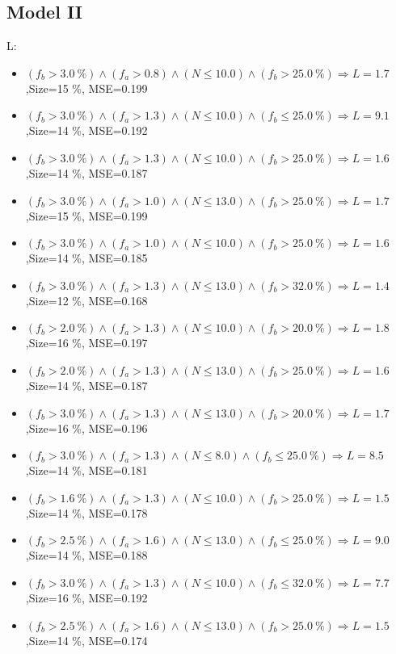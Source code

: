 \documentclass[numbered]{CSL}
\begin{document}
\subsection{Model II}
L:
\begin{itemize}
\item $(f_b > 3.0~\%) \land (f_a > 0.8) \land (N \leq 10.0) \land (f_b > 25.0~\%) \Rightarrow L = 1.7$,\hfill Size=15 \%, MSE=0.199
\item $(f_b > 3.0~\%) \land (f_a > 1.3) \land (N \leq 10.0) \land (f_b \leq 25.0~\%) \Rightarrow L = 9.1$,\hfill Size=14 \%, MSE=0.192
\item $(f_b > 3.0~\%) \land (f_a > 1.3) \land (N \leq 10.0) \land (f_b > 25.0~\%) \Rightarrow L = 1.6$,\hfill Size=14 \%, MSE=0.187
\item $(f_b > 3.0~\%) \land (f_a > 1.0) \land (N \leq 13.0) \land (f_b > 25.0~\%) \Rightarrow L = 1.7$,\hfill Size=15 \%, MSE=0.199
\item $(f_b > 3.0~\%) \land (f_a > 1.0) \land (N \leq 10.0) \land (f_b > 25.0~\%) \Rightarrow L = 1.6$,\hfill Size=14 \%, MSE=0.185
\item $(f_b > 3.0~\%) \land (f_a > 1.3) \land (N \leq 13.0) \land (f_b > 32.0~\%) \Rightarrow L = 1.4$,\hfill Size=12 \%, MSE=0.168
\item $(f_b > 2.0~\%) \land (f_a > 1.3) \land (N \leq 10.0) \land (f_b > 20.0~\%) \Rightarrow L = 1.8$,\hfill Size=16 \%, MSE=0.197
\item $(f_b > 2.0~\%) \land (f_a > 1.3) \land (N \leq 13.0) \land (f_b > 25.0~\%) \Rightarrow L = 1.6$,\hfill Size=14 \%, MSE=0.187
\item $(f_b > 3.0~\%) \land (f_a > 1.3) \land (N \leq 13.0) \land (f_b > 20.0~\%) \Rightarrow L = 1.7$,\hfill Size=16 \%, MSE=0.196
\item $(f_b > 3.0~\%) \land (f_a > 1.3) \land (N \leq 8.0) \land (f_b \leq 25.0~\%) \Rightarrow L = 8.5$,\hfill Size=14 \%, MSE=0.181
\item $(f_b > 1.6~\%) \land (f_a > 1.3) \land (N \leq 10.0) \land (f_b > 25.0~\%) \Rightarrow L = 1.5$,\hfill Size=14 \%, MSE=0.178
\item $(f_b > 2.5~\%) \land (f_a > 1.6) \land (N \leq 13.0) \land (f_b \leq 25.0~\%) \Rightarrow L = 9.0$,\hfill Size=14 \%, MSE=0.188
\item $(f_b > 3.0~\%) \land (f_a > 1.3) \land (N \leq 10.0) \land (f_b \leq 32.0~\%) \Rightarrow L = 7.7$,\hfill Size=16 \%, MSE=0.192
\item $(f_b > 2.5~\%) \land (f_a > 1.6) \land (N \leq 13.0) \land (f_b > 25.0~\%) \Rightarrow L = 1.5$,\hfill Size=14 \%, MSE=0.174

\end{itemize}
\end{document}
